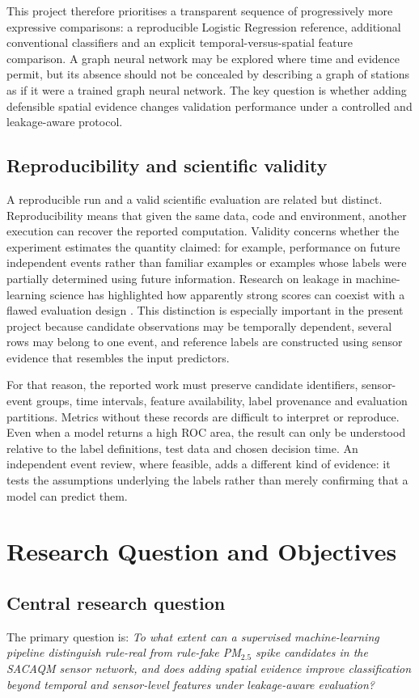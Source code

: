 \documentclass[12pt,a4paper,oneside]{report}
\newcommand{\pmf}{PM$_{2.5}$}
\begin{document}
This project therefore prioritises a transparent sequence of progressively more expressive comparisons: a reproducible Logistic Regression reference, additional conventional classifiers and an explicit temporal-versus-spatial feature comparison. A graph neural network may be explored where time and evidence permit, but its absence should not be concealed by describing a graph of stations as if it were a trained graph neural network. The key question is whether adding defensible spatial evidence changes validation performance under a controlled and leakage-aware protocol.

\section{Reproducibility and scientific validity}
A reproducible run and a valid scientific evaluation are related but distinct. Reproducibility means that given the same data, code and environment, another execution can recover the reported computation. Validity concerns whether the experiment estimates the quantity claimed: for example, performance on future independent events rather than familiar examples or examples whose labels were partially determined using future information. Research on leakage in machine-learning science has highlighted how apparently strong scores can coexist with a flawed evaluation design \citep{kapoor2023}. This distinction is especially important in the present project because candidate observations may be temporally dependent, several rows may belong to one event, and reference labels are constructed using sensor evidence that resembles the input predictors.

For that reason, the reported work must preserve candidate identifiers, sensor-event groups, time intervals, feature availability, label provenance and evaluation partitions. Metrics without these records are difficult to interpret or reproduce. Even when a model returns a high ROC area, the result can only be understood relative to the label definitions, test data and chosen decision time. An independent event review, where feasible, adds a different kind of evidence: it tests the assumptions underlying the labels rather than merely confirming that a model can predict them.

\chapter{Research Question and Objectives}
\section{Central research question}
The primary question is: \emph{To what extent can a supervised machine-learning pipeline distinguish rule-real from rule-fake \pmf{} spike candidates in the SACAQM sensor network, and does adding spatial evidence improve classification beyond temporal and sensor-level features under leakage-aware evaluation?}
\end{document}
